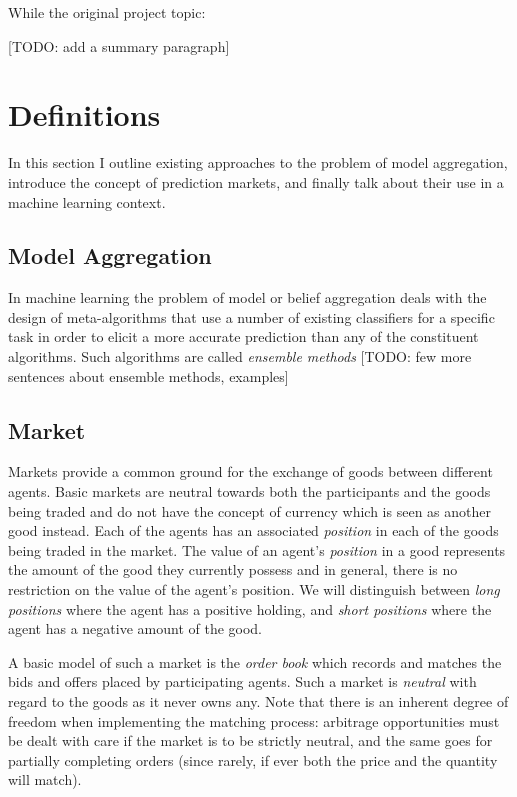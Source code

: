 \documentclass[bsc,frontabs,twoside,singlespacing,parskip,deptreport]{infthesis}     %
\begin{document}
	While the original project topic: 

   	[TODO: add a summary paragraph]
   
   
\chapter{Definitions}

    In this section I outline existing approaches to the problem of model aggregation, introduce the concept of prediction markets, and finally talk about their use in a machine learning context. 


\section{Model Aggregation}
    In machine learning the problem of model or belief aggregation deals with the design of meta-algorithms that use a number of existing classifiers for a specific task in order to elicit a more accurate prediction than any of the constituent algorithms. Such algorithms are called {\em ensemble methods} [TODO: few more sentences about ensemble methods, examples]

\section{Market}

    Markets provide a common ground for the exchange of goods between different agents. Basic markets are neutral towards both the participants and the goods being traded and do not have the concept of currency which is seen as another good instead. Each of the agents has an associated {\em position} in each of the goods being traded in the market. The value of an agent's {\em position} in a good represents the amount of the good they currently possess and in general, there is no restriction on the value of the agent's position. We will distinguish between {\em long positions} where the agent has a positive holding, and {\em short positions} where the agent has a negative amount of the good.

    A basic model of such a market is the {\em order book} which records and matches the bids and offers placed by participating agents. Such a market is {\em neutral} with regard to the goods as it never owns any. Note that there is an inherent degree of freedom when implementing the matching process: arbitrage opportunities must be dealt with care if the market is to be strictly neutral, and the same goes for partially completing orders (since rarely, if ever both the price and the quantity will match).
\end{document}
